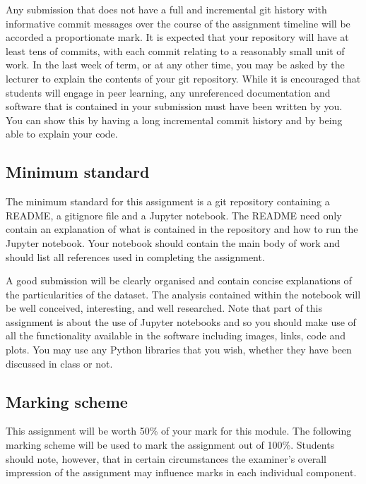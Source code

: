 \documentclass[12pt, a4paper, hidelinks]{scrartcl}
\begin{document}
  Any submission that does not have a full and incremental git history with informative commit messages over the course of the assignment timeline will be accorded a proportionate mark.
  It is expected that your repository will have at least tens of commits, with each commit relating to a reasonably small unit of work.
  In the last week of term, or at any other time, you may be asked by the lecturer to explain the contents of your git repository.
  While it is encouraged that students will engage in peer learning, any unreferenced documentation and software that is contained in your submission must have been written by you.
  You can show this by having a long incremental commit history and by being able to explain your code.


\subsection*{Minimum standard}
  The minimum standard for this assignment is a git repository containing a README, a gitignore file and a Jupyter notebook.
  The README need only contain an explanation of what is contained in the repository and how to run the Jupyter notebook.
  Your notebook should contain the main body of work and should list all references used in completing the assignment.

  A good submission will be clearly organised and contain concise explanations of the particularities of the dataset.
  The analysis contained within the notebook will be well conceived, interesting, and well researched.
  Note that part of this assignment is about the use of Jupyter notebooks and so you should make use of all the functionality available in the software including images, links, code and plots.
  You may use any Python libraries that you wish, whether they have been discussed in class or not.


\subsection*{Marking scheme}
  This assignment will be worth 50\% of your mark for this module.
  The following marking scheme will be used to mark the assignment out of 100\%.
  Students should note, however, that in certain circumstances the examiner's overall impression of the assignment may influence marks in each individual component.
\end{document}
